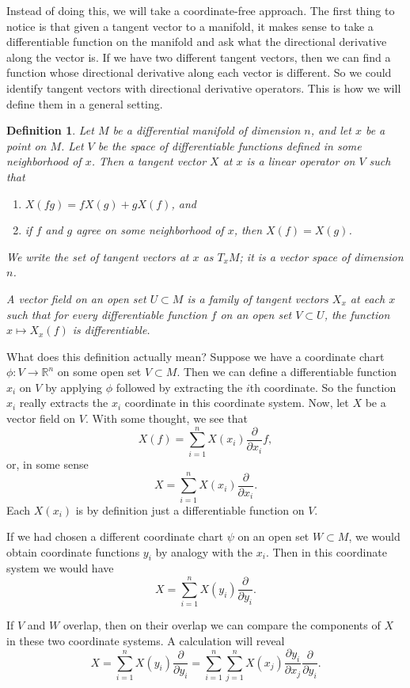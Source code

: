 \documentclass{article}
\newtheorem*{defn}{Definition}
\theoremstyle{remark}
\begin{document}
Instead of doing this, we will take a coordinate-free approach.  The first thing to notice is that given a tangent vector to a manifold, it makes sense to take a differentiable function on the manifold and ask what the directional derivative along the vector is.  If we have two different tangent vectors, then we can find a function whose directional derivative along each vector is different.  So we could identify tangent vectors with directional derivative operators.  This is how we will define them in a general setting.

\begin{defn}
Let $M$ be a differential manifold of dimension $n$, and let $x$ be a point on $M$.  Let $V$ be the space of differentiable functions defined in some neighborhood of $x$.  Then a \emph{tangent vector} $X$ at $x$ is a linear operator on $V$ such that
\begin{enumerate}
\item $X(fg) = fX(g)+gX(f)$, and
\item if $f$ and $g$ agree on some neighborhood of $x$, then $X(f)=X(g)$.
\end{enumerate}
We write the set of tangent vectors at $x$ as $T_xM$; it is a vector space of dimension $n$.

A \emph{vector field} on an open set $U\subset M$ is a family of tangent vectors $X_x$ at each $x$ such that for every differentiable function $f$ on an open set $V\subset U$, the function $x\mapsto X_x(f)$ is differentiable.
\end{defn}

What does this definition actually mean?  Suppose we have a coordinate chart $\phi\colon V\to \mathbb{R}^n$ on some open set $V\subset M$.  Then we can define a differentiable function $x_i$ on $V$ by applying $\phi$ followed by extracting the $i$th coordinate.  So the function $x_i$ really extracts the $x_i$ coordinate in this coordinate system.  Now, let $X$ be a vector field on $V$.  With some thought, we see that
\[
X(f) = \sum_{i=1}^n X(x_i)\frac{\partial}{\partial x_i} f,
\]
or, in some sense
\[
X = \sum_{i=1}^n X(x_i)\frac{\partial}{\partial x_i}.
\]
Each $X(x_i)$ is by definition just a differentiable function on $V$. 

If we had chosen a different coordinate chart $\psi$ on an open set $W\subset M$, we would obtain coordinate functions $y_i$ by analogy with the $x_i$.  Then in this coordinate system we would have
\[
X = \sum_{i=1}^n X(y_i)\frac{\partial}{\partial y_i}.
\]

If $V$ and $W$ overlap, then on their overlap we can compare the components of $X$ in these two coordinate systems.  A calculation will reveal
\[
X = \sum_{i=1}^n X(y_i)\frac{\partial}{\partial y_i}
  = \sum_{i=1}^n \sum_{j=1}^n X(x_j)\frac{\partial y_i}{\partial x_j}\frac{\partial}{\partial y_i}.
\]
\end{document}
